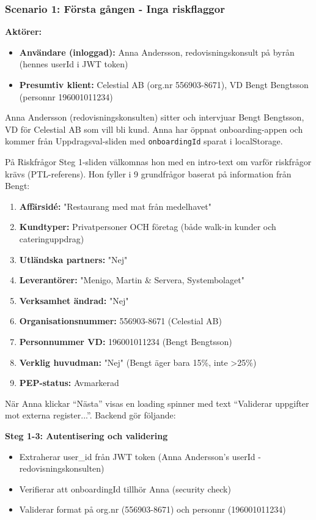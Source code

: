 \documentclass[12pt,a4paper]{article}
\begin{document}
\subsubsection{Scenario 1: Första gången - Inga riskflaggor}

\textbf{Aktörer:}
\begin{itemize}[noitemsep]
  \item \textbf{Användare (inloggad):} Anna Andersson, redovisningskonsult på byrån (hennes userId i JWT token)
  \item \textbf{Presumtiv klient:} Celestial AB (org.nr 556903-8671), VD Bengt Bengtsson (personnr 196001011234)
\end{itemize}

Anna Andersson (redovisningskonsulten) sitter och intervjuar Bengt Bengtsson, VD för Celestial AB som vill bli kund. Anna har öppnat onboarding-appen och kommer från Uppdragsval-sliden med \texttt{onboardingId} sparat i localStorage. 

På Riskfrågor Steg 1-sliden välkomnas hon med en intro-text om varför riskfrågor krävs (PTL-referens). Hon fyller i 9 grundfrågor baserat på information från Bengt:

\begin{enumerate}[noitemsep]
  \item \textbf{Affärsidé:} "Restaurang med mat från medelhavet"
  \item \textbf{Kundtyper:} Privatpersoner OCH företag (både walk-in kunder och cateringuppdrag)
  \item \textbf{Utländska partners:} "Nej"
  \item \textbf{Leverantörer:} "Menigo, Martin \& Servera, Systembolaget"
  \item \textbf{Verksamhet ändrad:} "Nej"
  \item \textbf{Organisationsnummer:} 556903-8671 (Celestial AB)
  \item \textbf{Personnummer VD:} 196001011234 (Bengt Bengtsson)
  \item \textbf{Verklig huvudman:} "Nej" (Bengt äger bara 15\%, inte >25\%)
  \item \textbf{PEP-status:} Avmarkerad
\end{enumerate}

När Anna klickar \enquote{Nästa} visas en loading spinner med text \enquote{Validerar uppgifter mot externa register...}. Backend gör följande:

\textbf{Steg 1-3: Autentisering och validering}
\begin{itemize}[noitemsep]
  \item Extraherar user\_id från JWT token (Anna Andersson's userId - redovisningskonsulten)
  \item Verifierar att onboardingId tillhör Anna (security check)
  \item Validerar format på org.nr (556903-8671) och personnr (196001011234)
\end{itemize}
\end{document}
